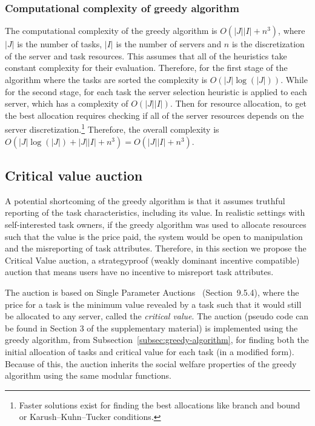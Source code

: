 \subsubsection{Computational complexity of greedy algorithm}
\label{subsubsec:greedy-time-complexity}
The computational complexity of the greedy algorithm is $O(\left|J\right| \left|I\right| + n^3)$, where $\left|J\right|$ is the number of tasks, $\left|I\right|$ is the number of servers and $n$ is the discretization of the server and task resources. This assumes that all of the heuristics take constant complexity for their evaluation. Therefore, for the first stage of the algorithm where the tasks are sorted the complexity is $O(\left|J\right| \log(\left|J\right|))$. While for the second stage, for each task the server selection heuristic is applied to each server, which has a complexity of $O(\left|J\right| \left|I\right|)$. Then for resource allocation, to get the best allocation requires checking if all of the server resources depends on the server discretization.\footnote{Faster solutions exist for finding the best allocations like branch and bound or Karush–Kuhn–Tucker conditions.} Therefore, the overall complexity is $O(\left|J\right| \log(\left|J\right|) + \left|J\right| \left|I\right| + n^3) = O(\left|J\right| \left|I\right| + n^3)$.

\subsection{Critical value auction}
\label{subsec:critical-value-auction}
A potential shortcoming of the greedy algorithm is that it assumes truthful reporting of the task characteristics, including its value. In realistic settings with self-interested task owners, if the greedy algorithm was used to allocate resources such that the value is the price paid, the system would be open to manipulation and the misreporting of task attributes. Therefore, in this section we propose the Critical Value auction, a strategyproof (weakly dominant incentive compatible) auction that means users have no incentive to misreport task attributes.

The auction is based on Single Parameter Auctions~\cite{nisan2007algorithmic} (Section~9.5.4), where the price for a task is the minimum value revealed by a task such that it would still be allocated to any server, called the \emph{critical value}. The auction (pseudo code can be found in Section 3 of the supplementary material) is implemented using the greedy algorithm, from Subsection~\ref{subsec:greedy-algorithm}, for finding both the initial allocation of tasks and critical value for each task (in a modified form). Because of this, the auction inherits the social welfare properties of the greedy algorithm using the same modular functions.

